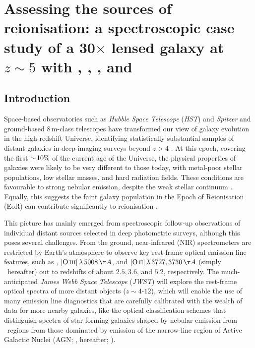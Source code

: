 
\chapter{Assessing the sources of reionisation: a spectroscopic case study of a 30\texorpdfstring{$\times$}{x} lensed galaxy at \texorpdfstring{$z \sim 5$}{z~5} with \texorpdfstring{\lya, \CIV, \MgII, and \NeIII}{\lyatext, CIV, MgII, and [NeIII]}}
\label{ch:Assessing the sources of reionisation}


\section{Introduction}
\label{ch2sec:Introduction}

Space-based observatories such as \textit{Hubble Space Telescope} (\textit{HST}) and \textit{Spitzer} and ground-based $8 \, \mathrm{m}$-class telescopes have transformed our view of galaxy evolution in the high-redshift Universe, identifying statistically substantial samples of distant galaxies in deep imaging surveys beyond $z>4$ \citep{2014ARA&A..52..415M}. At this epoch, covering the first $\sim \! 10\%$ of the current age of the Universe, the physical properties of galaxies were likely to be very different to those today, with metal-poor stellar populations, low stellar masses, and hard radiation fields. These conditions are favourable to strong nebular emission, despite the weak stellar continuum \citep[e.g.][]{2016ARA&A..54..761S}. Equally, this suggests the faint galaxy population in the Epoch of Reionisation (EoR) can contribute significantly to reionisation \citep[e.g.][]{2015ApJ...803...34B}.

This picture has mainly emerged from spectroscopic follow-up observations of individual distant sources selected in deep photometric surveys, although this poses several challenges. From the ground, near-infrared (NIR) spectrometers are restricted by Earth's atmosphere to observe key rest-frame optical emission line features, such as \Ha, $\OIIIf \, \lambda \, 5008 \, \Angstrom$, and $\OII \, \lambda \, 3727, 3730 \, \Angstrom$ (simply \OII\ hereafter) out to redshifts of about $2.5, 3.6$, and $5.2$, respectively. The much-anticipated \textit{James Webb Space Telescope} (\textit{JWST}) will explore the rest-frame optical spectra of more distant objects ($z \sim 4$-$12$), which will enable the use of many emission line diagnostics that are carefully calibrated with the wealth of data for more nearby galaxies, like the optical classification schemes that distinguish spectra of star-forming galaxies shaped by nebular emission from \HII\ regions from those dominated by emission of the narrow-line region of Active Galactic Nuclei (AGN; \citealt*{1981PASP...93....5B},  hereafter; \citealt{1987ApJS...63..295V}).

